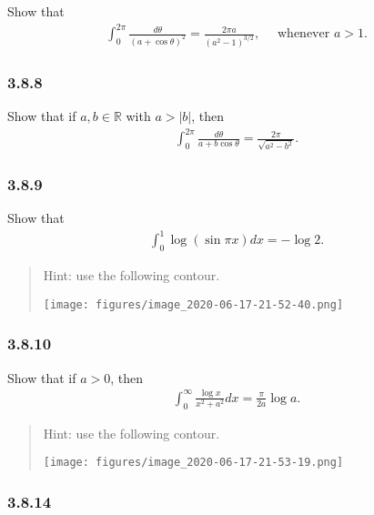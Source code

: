 Show that
\begin{align*}
\int_{0}^{2 \pi} \frac{d \theta}{(a+\cos \theta)^{2}}=\frac{2 \pi a}{\left(a^{2}-1\right)^{3 / 2}}, \quad \text { whenever } a>1
.\end{align*}

\hypertarget{section-66}{%
\subsubsection{3.8.8}\label{section-66}}

Show that if \(a,b\in {\mathbb{R}}\) with
\(a > {\left\lvert {b} \right\rvert}\), then
\begin{align*}
\int_{0}^{2 \pi} \frac{d \theta}{a+b \cos \theta}=\frac{2 \pi}{\sqrt{a^{2}-b^{2}}}
.\end{align*}

\hypertarget{section-67}{%
\subsubsection{3.8.9}\label{section-67}}

Show that
\begin{align*}
\int_{0}^{1} \log (\sin \pi x) d x=-\log 2
.\end{align*}

\begin{quote}
Hint: use the following contour.

\texttt{[image: figures/image\_2020-06-17-21-52-40.png]}
\end{quote}

\hypertarget{section-68}{%
\subsubsection{3.8.10}\label{section-68}}

Show that if \(a>0\), then
\begin{align*}
\int_{0}^{\infty} \frac{\log x}{x^{2}+a^{2}} d x=\frac{\pi}{2 a} \log a
.\end{align*}

\begin{quote}
Hint: use the following contour.

\texttt{[image: figures/image\_2020-06-17-21-53-19.png]}
\end{quote}

\hypertarget{section-69}{%
\subsubsection{3.8.14}\label{section-69}}

